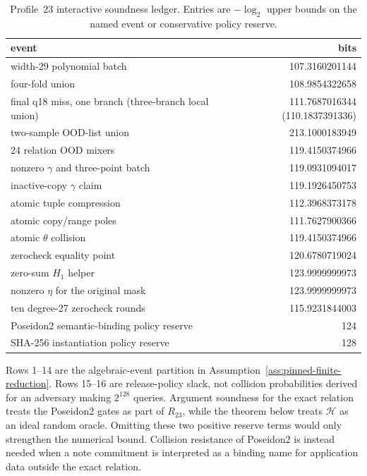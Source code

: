 \begin{table}[t]
\centering
\small
\caption{Profile~23 interactive soundness ledger.  Entries are
\(-\log_2\) upper bounds on the named event or conservative policy reserve.}
\label{tab:soundness-events}
\begin{tabular}{@{}lr@{}}
\toprule
event & bits \\
\midrule
width-29 polynomial batch & 107.3160201144 \\
four-fold union & 108.9854322658 \\
final q18 miss, one branch (three-branch local union) & 111.7687016344 (110.1837391336) \\
two-sample OOD-list union & 213.1000183949 \\
24 relation OOD mixers & 119.4150374966 \\
nonzero \(\gamma\) and three-point batch & 119.0931094017 \\
inactive-copy \(\gamma\) claim & 119.1926450753 \\
atomic tuple compression & 112.3968373178 \\
atomic copy/range poles & 111.7627900366 \\
atomic \(\theta\) collision & 119.4150374966 \\
zerocheck equality point & 120.6780719024 \\
zero-sum \(H_1\) helper & 123.9999999973 \\
nonzero \(\eta\) for the original mask & 123.9999999973 \\
ten degree-27 zerocheck rounds & 115.9231844003 \\
Poseidon2 semantic-binding policy reserve & 124 \\
SHA-256 instantiation policy reserve & 128 \\
\bottomrule
\end{tabular}
\end{table}

Rows 1--14 are the algebraic-event partition in
Assumption~\ref{ass:pinned-finite-reduction}.  Rows 15--16 are release-policy
slack, not collision probabilities derived for an adversary making
\(2^{128}\) queries.  Argument soundness for the exact relation treats the
Poseidon2 gates as part of \(R_{23}\), while the theorem below treats
\(\mathcal H\) as an ideal random oracle.  Omitting these two positive reserve
terms would only strengthen the numerical bound.  Collision resistance of
Poseidon2 is instead needed when a note commitment is interpreted as a
binding name for application data outside the exact relation.

